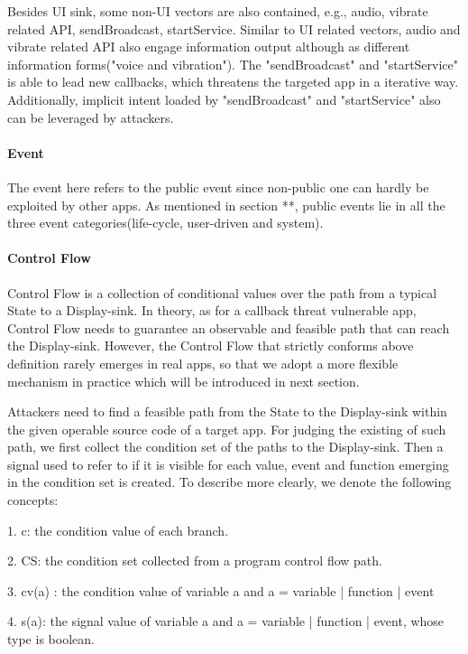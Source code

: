\documentclass{sig-alternate-05-2015}
\begin{document}
Besides UI sink, some non-UI vectors are also contained, e.g., audio, vibrate related API, sendBroadcast, startService. Similar to UI related vectors, audio and vibrate related API also engage information output although as different information forms("voice and vibration"). The "sendBroadcast" and "startService" is able to lead new callbacks, which threatens the targeted app in a iterative way. Additionally, implicit intent loaded by "sendBroadcast" and "startService" also can be leveraged by attackers.

\paragraph{Event}

The event here refers to the public event since non-public one can hardly be exploited by other apps. As mentioned in section **, public events lie in all the three event categories(life-cycle, user-driven and system).

\paragraph{Control Flow}

Control Flow is a collection of conditional values over the path from a typical State to a Display-sink. In theory, as for a callback threat vulnerable app, Control Flow needs to guarantee an observable and feasible path that can reach the Display-sink. However, the Control Flow that strictly conforms above definition rarely emerges in real apps, so that we adopt a more flexible mechanism in practice which will be introduced in next section.  

Attackers need to find a feasible path from the State to the Display-sink within the given operable source code of a target app. For judging the existing of such path, we first collect the condition set of the paths to the Display-sink. Then a signal used to refer to if it is visible for each value, event and function emerging in the condition set is created. To describe more clearly, we denote the following concepts:

1. c: the condition value of each branch.

2. CS: the condition set collected from a program control flow path.

3. cv(a) : the condition value of variable a and a = variable | function | event

4. s(a): the signal value of variable a and a = variable | function | event, whose type is boolean.
\end{document}
